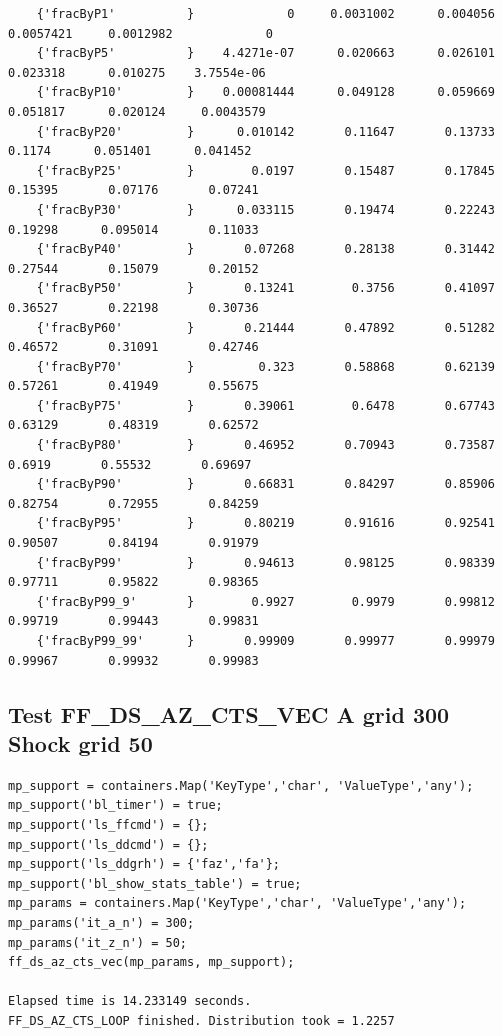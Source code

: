 \documentclass[
]{book}
\begin{document}
\begin{verbatim}
    {'fracByP1'          }             0     0.0031002      0.004056     0.0057421     0.0012982             0 
    {'fracByP5'          }    4.4271e-07      0.020663      0.026101      0.023318      0.010275    3.7554e-06 
    {'fracByP10'         }    0.00081444      0.049128      0.059669      0.051817      0.020124     0.0043579 
    {'fracByP20'         }      0.010142       0.11647       0.13733        0.1174      0.051401      0.041452 
    {'fracByP25'         }        0.0197       0.15487       0.17845       0.15395       0.07176       0.07241 
    {'fracByP30'         }      0.033115       0.19474       0.22243       0.19298      0.095014       0.11033 
    {'fracByP40'         }       0.07268       0.28138       0.31442       0.27544       0.15079       0.20152 
    {'fracByP50'         }       0.13241        0.3756       0.41097       0.36527       0.22198       0.30736 
    {'fracByP60'         }       0.21444       0.47892       0.51282       0.46572       0.31091       0.42746 
    {'fracByP70'         }         0.323       0.58868       0.62139       0.57261       0.41949       0.55675 
    {'fracByP75'         }       0.39061        0.6478       0.67743       0.63129       0.48319       0.62572 
    {'fracByP80'         }       0.46952       0.70943       0.73587        0.6919       0.55532       0.69697 
    {'fracByP90'         }       0.66831       0.84297       0.85906       0.82754       0.72955       0.84259 
    {'fracByP95'         }       0.80219       0.91616       0.92541       0.90507       0.84194       0.91979 
    {'fracByP99'         }       0.94613       0.98125       0.98339       0.97711       0.95822       0.98365 
    {'fracByP99_9'       }        0.9927        0.9979       0.99812       0.99719       0.99443       0.99831 
    {'fracByP99_99'      }       0.99909       0.99977       0.99979       0.99967       0.99932       0.99983 
\end{verbatim}

\hypertarget{test-ff_ds_az_cts_vec-a-grid-300-shock-grid-50}{%
\subsection{Test FF\_DS\_AZ\_CTS\_VEC A grid 300 Shock grid 50}\label{test-ff_ds_az_cts_vec-a-grid-300-shock-grid-50}}

\begin{verbatim}
mp_support = containers.Map('KeyType','char', 'ValueType','any');
mp_support('bl_timer') = true;
mp_support('ls_ffcmd') = {};
mp_support('ls_ddcmd') = {};
mp_support('ls_ddgrh') = {'faz','fa'};
mp_support('bl_show_stats_table') = true;
mp_params = containers.Map('KeyType','char', 'ValueType','any');
mp_params('it_a_n') = 300;
mp_params('it_z_n') = 50;
ff_ds_az_cts_vec(mp_params, mp_support);

Elapsed time is 14.233149 seconds.
FF_DS_AZ_CTS_LOOP finished. Distribution took = 1.2257
\end{verbatim}
\end{document}
